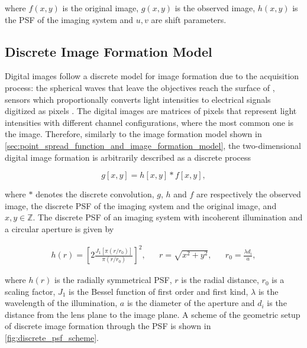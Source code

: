 \noindent where $f(x,y)$ is the original image, $g(x,y)$ is the observed image, $h(x,y)$ is the PSF of the imaging system and $u,v$ are shift parameters.

\subsection{Discrete Image Formation Model}

Digital images follow a discrete model for image formation due to the acquisition process: the spherical waves that leave the objectives reach the surface of , sensors which proportionally converts light intensities to electrical signals digitized as pixels \cite{gonzalez2018digital}. The digital images are matrices of pixels that represent light intensities with different channel configurations, where the most common one is the  image. Therefore, similarly to the image formation model shown in \autoref{sec:point_spread_function_and_image_formation_model}, the two-dimensional digital image formation is arbitrarily described as a discrete process

\begin{equation}
\label{eqn:discrete_image_formation}
g[x,y] = h[x,y] \ast f[x,y],
\end{equation}

\noindent where $\ast$ denotes the discrete convolution, $g$, $h$ and $f$ are respectively the observed image, the discrete PSF of the imaging system and the original image, and $x,y \in \mathbb{Z}$. The discrete PSF of an imaging system with incoherent illumination and a circular aperture is given by

\begin{align}
\label{eqn:discrete_psf}
h(r) = \left[
        2
        \frac{J_{1}[\pi (r / r_{0})]}{\pi (r / r_{0})}
       \right]^{2},
&&
r = \sqrt{x^{2} + y^{2}},
&&
r_{0} = \frac{\lambda d_{i}}{a},
\end{align}

\noindent where $h(r)$ is the radially symmetrical PSF, $r$ is the radial distance, $r_{0}$ is a scaling factor, $J_{1}$ is the Bessel function of first order and first kind, $\lambda$ is the wavelength of the illumination, $a$ is the diameter of the aperture and $d_{i}$ is the distance from the lens plane to the image plane. A scheme of the geometric setup of discrete image formation through the PSF is shown in \autoref{fig:discrete_psf_scheme}.

